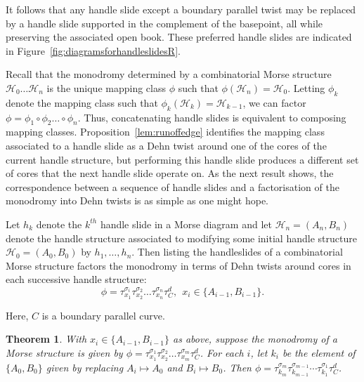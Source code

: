 \documentclass{amsart}
\newtheorem{theorem}{Theorem}[section]
\theoremstyle{definition}
\def\H{\mathcal{H}}
\begin{document}
It follows that any handle slide except a boundary parallel twist may be replaced by a handle slide supported in the complement of the basepoint, all while preserving the associated open book.  These preferred handle slides are indicated in Figure~\ref{fig:diagramsforhandleslidesR}.




Recall that the monodromy determined by a combinatorial Morse structure $\H_0\dots \H_n$ is the unique mapping class $\phi$ such that $\phi(\mathcal{H}_{n})=\mathcal{H}_{0}$.  Letting $\phi_k$ denote the mapping class such that $\phi_k(\H_k)=\H_{k-1}$, we can factor $\phi=\phi_1\circ \phi_2\dots \circ \phi_n$. Thus, concatenating handle slides is equivalent to composing mapping classes. Proposition~\ref{lem:runoffedge} identifies the mapping class associated to a handle slide as a Dehn twist around one of the cores of the current handle structure,  but performing this handle slide produces a different set of cores that the next handle slide operate on.  As the next result shows, the correspondence between a sequence of handle slides and a factorisation of the monodromy into Dehn twists is as simple as one might hope.  

Let $h_{k}$ denote the $k^{th}$ handle slide in a Morse diagram and let $\H_n=(A_n, B_n)$ denote the handle structure associated to modifying some initial handle structure $\H_0=(A_0, B_0)$ by $h_{1}, \dots, h_{n}$. Then listing the handleslides of a combinatorial Morse structure factors the monodromy in terms of Dehn twists around cores in each successive handle structure:
\[ \phi= \tau_{x_1}^{\sigma_i} \tau_{x_2}^{\sigma_2}\dots \tau_{x_n}^{\sigma_n}\tau_C^d, \ \ x_i\in\{A_{i-1}, B_{i-1}\}.\]

Here, $C$ is a boundary parallel curve.  


\begin{theorem}\label{thm:factorisation} With $x_i\in \{A_{i-1}, B_{i-1}\}$ as above,  suppose the monodromy of a Morse structure is given by $\phi= \tau_{x_1}^{\sigma_1} \tau_{x_2}^{\sigma_2}\dots \tau_{x_m}^{\sigma_m}\tau_C^d$.
For each $i$, let $k_i$ be the element of  $\{A_0, B_0\}$ given by replacing $A_i\mapsto A_0$ and $B_i\mapsto B_0$.  Then $\phi=\tau^{\sigma_m}_{k_{m}}\tau^{\sigma_{m-1}}_{k_{m-1}}\cdots\tau^{\sigma_1}_{k_{1}}\tau_C^{d}$.
\end{theorem}
\end{document}
